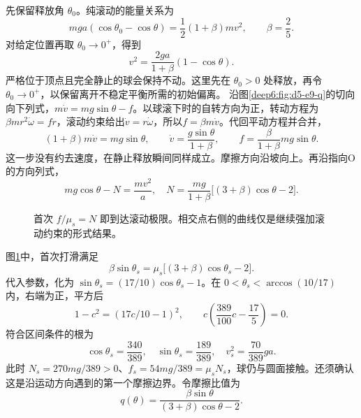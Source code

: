 \begin{solution}
先保留释放角 $\theta_0$。纯滚动的能量关系为
\[
mg a(\cos\theta_0-\cos\theta)=\frac12(1+\beta)mv^2,
\qquad \beta=\frac25.
\]
对给定位置再取 $\theta_0\to0^+$，得到
\[
v^2=\frac{2ga}{1+\beta}(1-\cos\theta).
\]
严格位于顶点且完全静止的球会保持不动。这里先在 $\theta_0>0$ 处释放，再令 $\theta_0\to0^+$，以保留离开不稳定平衡所需的初始偏离。
沿图\ref{deep6:fig:d5-e9-q}的切向向下列式，$m\dot v=mg\sin\theta-f$。以球滚下时的自转方向为正，转动方程为$\beta mr^2\dot\omega=fr$，滚动约束给出$\dot v=r\dot\omega$，所以$f=\beta m\dot v$。代回平动方程并合并，
\[
(1+\beta)m\dot v=mg\sin\theta,\qquad
\dot v=\frac{g\sin\theta}{1+\beta},\qquad
f=\frac{\beta}{1+\beta}mg\sin\theta.
\]
这一步没有约去速度，在静止释放瞬间同样成立。摩擦方向沿坡向上。再沿指向O的方向列式，
\[
mg\cos\theta-N=\frac{mv^2}a,
\quad N=\frac{mg}{1+\beta}\big[(3+\beta)\cos\theta-2\big].
\]
\begin{figure}[H]\centering
{}
\caption{首次 $f/\mu_s=N$ 即到达滚动极限。相交点右侧的曲线仅是继续强加滚动约束的形式结果。}\label{deep6:fig:d5-e9-s}
\end{figure}
图\ref{deep6:fig:d5-e9-s}中，首次打滑满足
\[
\beta\sin\theta_s=\mu_s\big[(3+\beta)\cos\theta_s-2\big].
\]
代入参数，化为 $\sin\theta_s=(17/10)\cos\theta_s-1$。在 $0<\theta_s<\arccos(10/17)$ 内，右端为正，平方后
\[
1-c^2=(17c/10-1)^2,\qquad
c\left(\frac{389}{100}c-\frac{17}5\right)=0.
\]
符合区间条件的根为
\[
\cos\theta_s=\frac{340}{389},\quad
\sin\theta_s=\frac{189}{389},\quad
v_s^2=\frac{70}{389}ga.
\]
此时 $N_s=270mg/389>0$、$f_s=54mg/389=\mu_sN_s$，球仍与圆面接触。还须确认这是沿运动方向遇到的第一个摩擦边界。令摩擦比值为
\[
q(\theta)=\frac{\beta\sin\theta}{(3+\beta)\cos\theta-2}.
\]

\end{solution}
